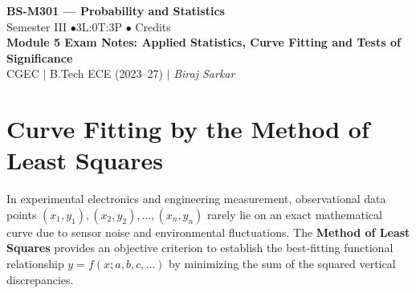 \documentclass[12pt,a4paper]{article}
\begin{document}
\begin{center}
  {\LARGE\bfseries\color{myred} BS-M301 --- Probability and Statistics}\\[5pt]
  {\normalsize\color{mydark} Semester III \quad$\bullet$\quad 3L:0T:3P \quad$\bullet$ Credits}\\[3pt]
  {\normalsize\color{myteal}\textbf{Module 5 Exam Notes: Applied Statistics, Curve Fitting and Tests of Significance}}\\[3pt]
  {\small\color{mydark} CGEC \;$|$\; B.Tech ECE (2023--27) \;$|$\; \textit{Biraj Sarkar}}
\end{center}
\vspace{2pt}
\noindent{\color{myred}\rule{\linewidth}{1.5pt}}
\vspace{2pt}

\hypersetup{linkcolor=mydark}
\tableofcontents
\hypersetup{linkcolor=myteal}
\newpage

\section{Curve Fitting by the Method of Least Squares}

In experimental electronics and engineering measurement, observational data points $(x_1, y_1), (x_2, y_2), \dots, (x_n, y_n)$ rarely lie on an exact mathematical curve due to sensor noise and environmental fluctuations. The \textbf{Method of Least Squares} provides an objective criterion to establish the best-fitting functional relationship $y = f(x; a, b, c, \dots)$ by minimizing the sum of the squared vertical discrepancies.
\end{document}
